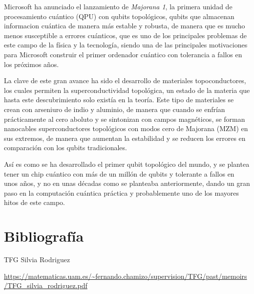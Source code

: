 \documentclass{article}
\numberwithin{equation}{section} %
\begin{document}
    \vspace{5mm}

    Microsoft ha anunciado el lanzamiento de \textit{Majorana 1}, la primera unidad de procesamiento cuántico (QPU) con qubits topológicos, qubits que almacenan informacion cuántica de manera más estable y robusta, de manera que es mucho menos susceptible a errores cuánticos, que es uno de los principales problemas de este campo de la física y la tecnología, siendo una de las principales motivaciones para Microsoft construir el primer ordenador cuántico con tolerancia a fallos en los próximos años.

    \vspace{5mm}

    La clave de este gran avance ha sido el desarrollo de materiales topoconductores, los cuales permiten la superconductividad topológica, un estado de la materia que hasta este descubrimiento solo existía en la teoría. Este tipo de materiales se crean con arseniuro de indio y aluminio, de manera que cuando se enfrían prácticamente al cero aboluto y se sintonizan con campos magnéticos, se forman nanocables superconductores topológicos con modos cero de Majorana (MZM) en sus extremos, de manera que aumentan la estabilidad y se reducen los errores en comparación con los qubits tradicionales.
    \vspace{5mm}

    Así es como se ha desarrollado el primer qubit topológico del mundo, y se plantea tener un chip cuántico con más de un millón de qubits y tolerante a fallos en unos años, y no en unas décadas como se planteaba anteriormente, dando un gran paso en la computación cuántica práctica y probablemente uno de los mayores hitos de este campo.





    \newpage
    \thispagestyle{empty}
    \mbox{}
    \newpage

    \section{Bibliografía}

        \vspace{5mm}

        TFG Silvia Rodriguez\par
        \url{https://matematicas.uam.es/~fernando.chamizo/supervision/TFG/past/memoirs/TFG_silvia_rodriguez.pdf}
        \vspace{2mm}
\end{document}
